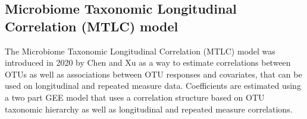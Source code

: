 \documentclass[12pt]{article}
\begin{document}
\begin{singlespace}
  \section{Microbiome Taxonomic Longitudinal Correlation (MTLC) model}
\end{singlespace}
The Microbiome Taxonomic Longitudinal Correlation (MTLC) model was introduced in 2020 by Chen and Xu\cite{chen2020generalized} as a way to estimate correlations between OTUs as well as associations between OTU responses and covariates, that can be used on longitudinal and repeated measure data. Coefficients are estimated using a two part GEE model that uses a correlation structure based on OTU taxonomic hierarchy as well as longitudinal and repeated measure correlations.


%

\end{document}
